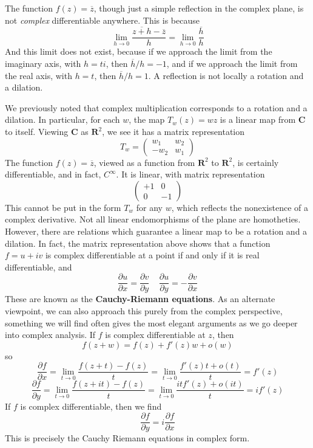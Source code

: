 \begin{example}
    The function $f(z) = \overline{z}$, though just a simple reflection in the complex plane, is not {\it complex} differentiable anywhere. This is because
    \[ \lim_{h \to 0} \frac{\overline{z + h} - \overline{z}}{h} = \lim_{h \to 0} \frac{\overline{h}}{h} \]
    And this limit does not exist, because if we approach the limit from the imaginary axis, with $h = ti$, then $\overline{h}/h = -1$, and if we approach the limit from the real axis, with $h = t$, then $\overline{h}/h = 1$. A reflection is not locally a rotation and a dilation.
\end{example}

We previously noted that complex multiplication corresponds to a rotation and a dilation. In particular, for each $w$, the map $T_w(z) = wz$ is a linear map from $\mathbf{C}$ to itself. Viewing $\mathbf{C}$ as $\mathbf{R}^2$, we see it has a matrix representation
%
\[ T_w = \begin{pmatrix} w_1 & w_2 \\ -w_2 & w_1 \end{pmatrix} \]
%
The function $f(z) = \overline{z}$, viewed as a function from $\mathbf{R}^2$ to $\mathbf{R}^2$, is certainly differentiable, and in fact, $C^\infty$. It is linear, with matrix representation
%
\[ \begin{pmatrix} +1 & 0 \\ 0 & -1 \end{pmatrix} \]
%
This cannot be put in the form $T_w$ for any $w$, which reflects the nonexistence of a complex derivative. Not all linear endomorphisms of the plane are homotheties. However, there are relations which guarantee a linear map to be a rotation and a dilation. In fact, the matrix representation above shows that a function $f = u + iv$ is complex differentiable at a point if and only if it is real differentiable, and
%
\[ \frac{\partial u}{\partial x} = \frac{\partial v}{\partial y}\ \ \ \ \ \frac{\partial u}{\partial y} = -\frac{\partial v}{\partial x} \]
%
These are known as the {\bf Cauchy-Riemann equations}. As an alternate viewpoint, we can also approach this purely from the complex perspective, something we will find often gives the most elegant arguments as we go deeper into complex analysis. If $f$ is complex differentiable at $z$, then
%
\[ f(z + w) = f(z) + f'(z)w + o(w) \]
%
so
%
\[ \frac{\partial f}{\partial x} = \lim_{t \to 0} \frac{f(z + t) - f(z)}{t} = \lim_{t \to 0} \frac{f'(z)t + o(t)}{t} = f'(z) \]
\[ \frac{\partial f}{\partial y} = \lim_{t \to 0} \frac{f(z + it) - f(z)}{t} = \lim_{t \to 0} \frac{itf'(z) + o(it)}{t} = if'(z) \]
%
If $f$ is complex differentiable, then we find
%
\[ \frac{\partial f}{\partial y} = i\frac{\partial f}{\partial x} \]
%
This is precisely the Cauchy Riemann equations in complex form.











